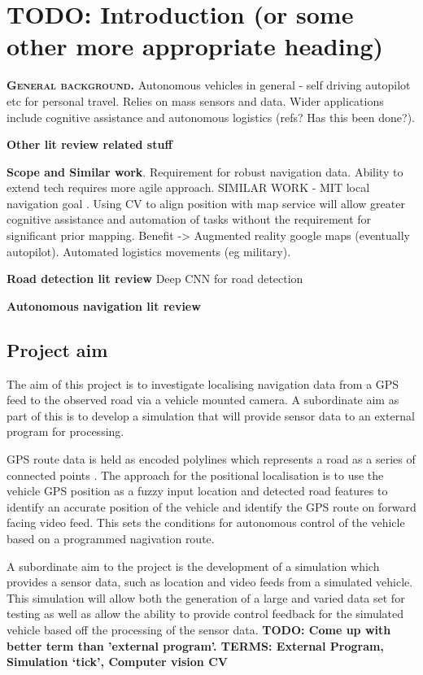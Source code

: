 \documentclass[]{aiaa-tc}%
\begin{document}
\newpage
\section{TODO: Introduction (or some other more appropriate heading)} \label{sect:intro}


\lettrine[nindent=0pt]{\textbf{G}}{\textbf{eneral background.}} Autonomous vehicles in general - self driving autopilot etc for personal travel. Relies on mass sensors and data. Wider applications include cognitive assistance and autonomous logistics (refs? Has this been done?). 

\textbf{Other lit review related stuff}

\textbf{Scope and Similar work}. Requirement for robust navigation data. Ability to extend tech requires more agile approach. SIMILAR WORK - MIT local navigation goal \citep{mitLocalNavDriving}. Using CV to align position with map service will allow greater cognitive assistance and automation of tasks without the requirement for significant prior mapping. Benefit -> Augmented reality google maps (eventually autopilot). Automated logistics movements (eg military).

\textbf{Road detection lit review} 
Deep CNN for road detection \citep{deepRoadSegmentation}

\textbf{Autonomous navigation lit review}

\subsection{Project aim}

The aim of this project is to investigate localising navigation data from a GPS feed to the observed road via a vehicle mounted camera. A subordinate aim as part of this is to develop a simulation that will provide sensor data to an external program for processing. 

GPS route data is held as encoded polylines which represents a road as a series of connected points \citep{googleMapPolyline}. The approach for the positional localisation is to use the vehicle GPS position as a fuzzy input location and detected road features to identify an accurate position of the vehicle and identify the GPS route on forward facing video feed. This sets the conditions for autonomous control of the vehicle based on a programmed nagivation route. 

A subordinate aim to the project is the development of a simulation which provides a sensor data, such as location and video feeds from a simulated vehicle. This simulation will allow both the generation of a large and varied data set for testing as well as allow the ability to provide control feedback for the simulated vehicle based off the processing of the sensor data.
\textbf{TODO: Come up with better term than 'external program'. TERMS: External Program, Simulation `tick', Computer vision CV}
\end{document}
